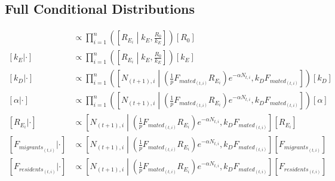 \documentclass{article}[12pt]
\begin{document}
\subsection*{Full Conditional Distributions}
\begin{align*}
	[R_0 | \cdot] & \propto \prod_{i=1}^{n} \left( \left[ R_{E_i} \middle | k_{E}, \frac{R_{0}}{k_E} \right] \right)[R_0] \\
	[k_E | \cdot] & \propto \prod_{i=1}^{n}\left( \left[ R_{E_i} \middle | k_{E}, \frac{R_{0}}{k_E} \right] \right) \left[k_E \right] \\
	[k_D | \cdot] & \propto \prod_{i=1}^{n}\left( \left[N_{(t+1), i} \middle | \left(\frac{1}{p}F_{{mated}_{(t, i)}}R_{E_i} \right)e^{-\alpha N_{t, i}}, k_DF_{{mated}_{(t, i)}} \right] \right) \left[k_D \right] \\
	[\alpha | \cdot] & \propto \prod_{i=1}^{n}\left( \left[N_{(t+1), i} \middle | \left(\frac{1}{p}F_{{mated}_{(t, i)}}R_{E_i} \right)e^{-\alpha N_{t, i}}, k_DF_{{mated}_{(t, i)}} \right] \right) \left [\alpha \right] \\
	[R_{E_i} | \cdot] & \propto \left[ N_{(t+1), i} \middle | \left(\frac{1}{p}F_{{mated}_{(t, i)}}R_{E_i}\right)e^{-\alpha N_{t, i}}, k_DF_{{mated}_{(t, i)}}\right] \left[R_{E_i}\right] \\
	[F_{{migrants}_{(t, i)}} | \cdot] & \propto \left[N_{(t+1), i} \middle | \left(\frac{1}{p}F_{{mated}_{(t, i)}}R_{E_i} \right)e^{-\alpha N_{t, i}}, k_DF_{{mated}_{(t, i)}} \right] \left[F_{{migrants}_{(t, i)}} \right] \\
	[F_{{residents}_{(t, i)}}  | \cdot] & \propto \left[N_{(t+1), i} \middle | \left(\frac{1}{p}F_{{mated}_{(t, i)}}R_{E_i} \right)e^{-\alpha N_{t, i}}, k_DF_{{mated}_{(t, i)}} \right] \left[F_{{residents}_{(t, i)}} \right] 
\end{align*}


\end{document}
